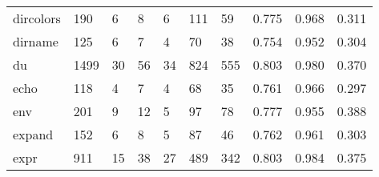\begin{longtable}{lp{1.3cm}p{1.3cm}p{1.3cm}p{1.3cm}p{1.3cm}p{1.3cm}p{1.3cm}p{1.3cm}p{1.3cm}}
dircolors &                    190 &                                  6 &                                 8 &                                6 &                               111 &                              59 &                                   0.775 &                                  0.968 &                                0.311 \\
dirname   &                    125 &                                  6 &                                 7 &                                4 &                                70 &                              38 &                                   0.754 &                                  0.952 &                                0.304 \\
du        &                   1499 &                                 30 &                                56 &                               34 &                               824 &                             555 &                                   0.803 &                                  0.980 &                                0.370 \\
echo      &                    118 &                                  4 &                                 7 &                                4 &                                68 &                              35 &                                   0.761 &                                  0.966 &                                0.297 \\
env       &                    201 &                                  9 &                                12 &                                5 &                                97 &                              78 &                                   0.777 &                                  0.955 &                                0.388 \\
expand    &                    152 &                                  6 &                                 8 &                                5 &                                87 &                              46 &                                   0.762 &                                  0.961 &                                0.303 \\
expr      &                    911 &                                 15 &                                38 &                               27 &                               489 &                             342 &                                   0.803 &                                  0.984 &                                0.375 \\

\end{longtable}

